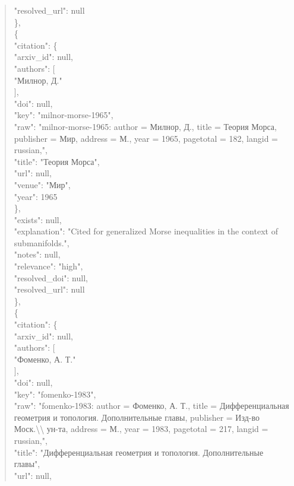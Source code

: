 \documentclass[11pt]{article}
\begin{document}
\begin{quote}
      "resolved\_url": null\\
    \},\\
    \{\\
      "citation": \{\\
        "arxiv\_id": null,\\
        "authors": [\\
          "Милнор, Д."\\
        ],\\
        "doi": null,\\
        "key": "milnor-morse-1965",\\
        "raw": "milnor-morse-1965: author = Милнор, Д., title = Теория Морса, publisher = Мир, address = М., year = 1965, pagetotal = 182, langid = russian,",\\
        "title": "Теория Морса",\\
        "url": null,\\
        "venue": "Мир",\\
        "year": 1965\\
      \},\\
      "exists": null,\\
      "explanation": "Cited for generalized Morse inequalities in the context of submanifolds.",\\
      "notes": null,\\
      "relevance": "high",\\
      "resolved\_doi": null,\\
      "resolved\_url": null\\
    \},\\
    \{\\
      "citation": \{\\
        "arxiv\_id": null,\\
        "authors": [\\
          "Фоменко, А. Т."\\
        ],\\
        "doi": null,\\
        "key": "fomenko-1983",\\
        "raw": "fomenko-1983: author = Фоменко, А. Т., title = Дифференциальная геометрия и топология. Дополнительные главы, publisher = Изд-во Моск.\textbackslash{}\textbackslash{} ун-та, address = М., year = 1983, pagetotal = 217, langid = russian,",\\
        "title": "Дифференциальная геометрия и топология. Дополнительные главы",\\
        "url": null,\\

\end{quote}
\end{document}
